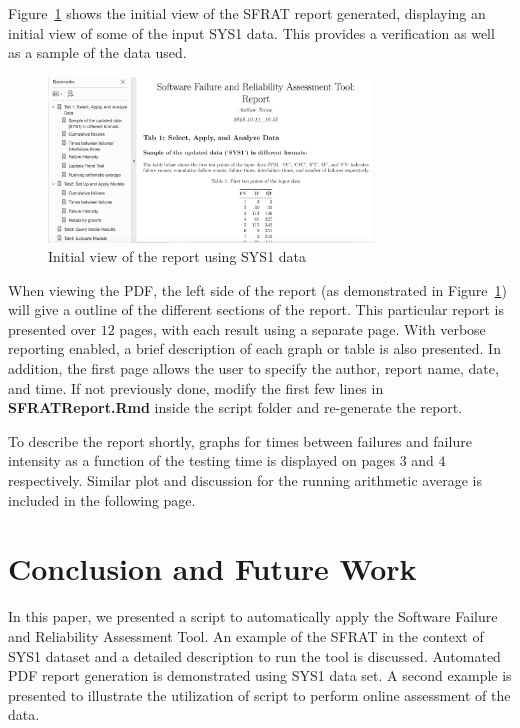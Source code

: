 \documentclass[conference]{IEEEtran}
\begin{document}
Figure~\ref{fig:SYS1Report} shows the initial view of the SFRAT report generated, displaying an initial view of some of the input SYS1 data. This provides a verification as well as a sample of the data used.
\begin{figure}[!ht]
\centering
\includegraphics[width=3.4in]{Figures/SYS1Report}
\caption{Initial view of the report using SYS1 data}
\label{fig:SYS1Report}
\end{figure}

When viewing the PDF, the left side of the report (as demonstrated in Figure~\ref{fig:SYS1Report}) will give a outline of the different sections of the report. This particular report is presented over $12$ pages, with each result using a separate page. With verbose reporting enabled, a brief description of each graph or table is also presented. In addition, the first page allows the user to specify the author, report name, date, and time. If not previously done, modify the first few lines in \textbf{SFRATReport.Rmd} inside the script folder and re-generate the report.

To describe the report shortly, graphs for times between failures and failure intensity as a function of the testing time is displayed on pages $3$ and $4$ respectively. Similar plot and discussion for the running arithmetic average is included in the following page.





\section{Conclusion and Future Work}\label{sec:Concl}
In this paper, we presented a script to automatically apply the Software Failure and Reliability Assessment Tool. An example of the SFRAT in the context of SYS1 dataset and a detailed description to run the tool is discussed. Automated PDF report generation is demonstrated using SYS1 data set. A second example is presented to illustrate the utilization of script to perform online assessment of the data. 
\end{document}
